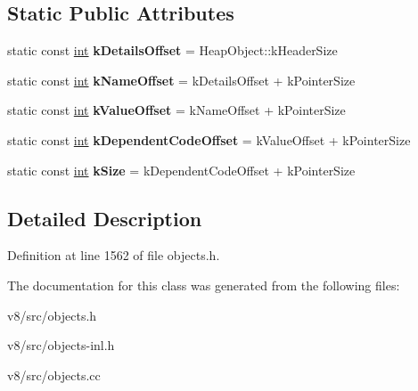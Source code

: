\subsection*{Static Public Attributes}
\begin{DoxyCompactItemize}
\item 
\mbox{\label{classv8_1_1internal_1_1PropertyCell_a9eca2ab1acc9e7d269c42234bd6f0ae9}} 
static const \mbox{\hyperlink{classint}{int}} {\bfseries k\+Details\+Offset} = Heap\+Object\+::k\+Header\+Size
\item 
\mbox{\label{classv8_1_1internal_1_1PropertyCell_aaaa5829de0a02eb4a92a5d6510d88500}} 
static const \mbox{\hyperlink{classint}{int}} {\bfseries k\+Name\+Offset} = k\+Details\+Offset + k\+Pointer\+Size
\item 
\mbox{\label{classv8_1_1internal_1_1PropertyCell_a35f0fea4789352fe9b971e8486d6034d}} 
static const \mbox{\hyperlink{classint}{int}} {\bfseries k\+Value\+Offset} = k\+Name\+Offset + k\+Pointer\+Size
\item 
\mbox{\label{classv8_1_1internal_1_1PropertyCell_a4170212f9537f0386e47d0cb3992862d}} 
static const \mbox{\hyperlink{classint}{int}} {\bfseries k\+Dependent\+Code\+Offset} = k\+Value\+Offset + k\+Pointer\+Size
\item 
\mbox{\label{classv8_1_1internal_1_1PropertyCell_aebba1cc2196a61c1f8e639175a9a83d5}} 
static const \mbox{\hyperlink{classint}{int}} {\bfseries k\+Size} = k\+Dependent\+Code\+Offset + k\+Pointer\+Size
\end{DoxyCompactItemize}


\subsection{Detailed Description}


Definition at line 1562 of file objects.\+h.



The documentation for this class was generated from the following files\+:\begin{DoxyCompactItemize}
\item 
v8/src/objects.\+h\item 
v8/src/objects-\/inl.\+h\item 
v8/src/objects.\+cc\end{DoxyCompactItemize}
